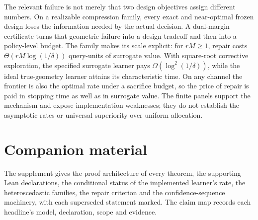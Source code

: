 The relevant failure is not merely that two design objectives assign different numbers.
On a realizable compression family, every exact and near-optimal frozen design loses the
information needed by the actual decision. A dual-margin certificate turns that geometric
failure into a design tradeoff and then into a policy-level budget. The family makes its
scale explicit: for $rM\ge1$, repair costs $\Theta(rM\log(1/\delta))$ query-units of surrogate
value. With square-root corrective exploration, the specified surrogate learner pays
$\Omega(\log^2(1/\delta))$, while the ideal true-geometry learner attains its characteristic
time. On any channel the frontier is also the optimal rate under a sacrifice budget, so the
price of repair is paid in stopping time as well as in surrogate value. The finite panels
support the mechanism and expose implementation weaknesses; they
do not establish the asymptotic rates or universal superiority over uniform allocation.

\section*{Companion material}
The supplement gives the proof architecture of every theorem, the supporting Lean declarations,
the conditional status of the implemented learner's rate, the heteroscedastic families, the
repair criterion and the confidence-sequence machinery, with each superseded statement marked.
The claim map records each headline's model, declaration, scope and evidence.

